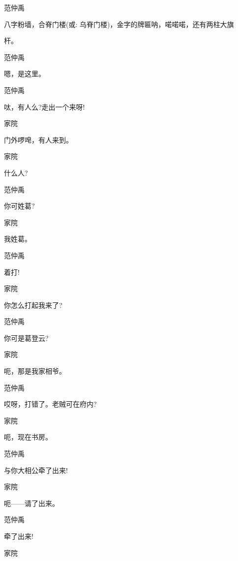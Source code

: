 范仲禹

八字粉墙，合脊门楼({\akai 或}: 乌脊门楼)，金字的牌匾呐，喏喏喏，还有两柱大旗

杆。

范仲禹\hspace{20pt}~

嗯，是这里。

范仲禹\hspace{20pt}~

呔，有人么?走出一个来呀!

家院\hspace{30pt}~

门外啰唣，有人来到。

家院\hspace{30pt}~

什么人?

范仲禹\hspace{20pt}~

你可姓葛?

家院\hspace{30pt}~

我姓葛。

范仲禹\hspace{20pt}~

着打!

家院\hspace{30pt}~

你怎么打起我来了?

范仲禹\hspace{20pt}~

你可是葛登云?

家院\hspace{30pt}~

呃，那是我家相爷。

范仲禹\hspace{20pt}~

哎呀，打错了。老贼可在府内?

家院\hspace{30pt}~

呃，现在书房。

范仲禹\hspace{20pt}~

与你大相公牵了出来!

家院\hspace{30pt}~

呃------请了出来。

范仲禹\hspace{20pt}~

牵了出来!

家院\hspace{30pt}~

